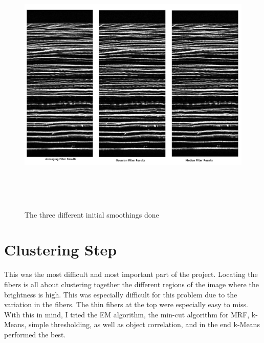 \documentclass[11pt,psfig]{article}
\begin{document}
\begin{figure}[H]
\centering
\includegraphics[height=5in]{initialSmoothComparisonPic.jpg}
\caption{The three different initial smoothings done}
\end{figure}

\section{Clustering Step}

This was the most difficult and most important part of the project. Locating the fibers is all about clustering together the different regions of the image where the brightness is high. This was especially difficult for this problem due to the variation in the fibers. The thin fibers at the top were especially easy to miss. With this in mind, I tried the EM algorithm, the min-cut algorithm for MRF, k-Means, simple thresholding, as well as object correlation, and in the end k-Means performed the best. 
\end{document}
